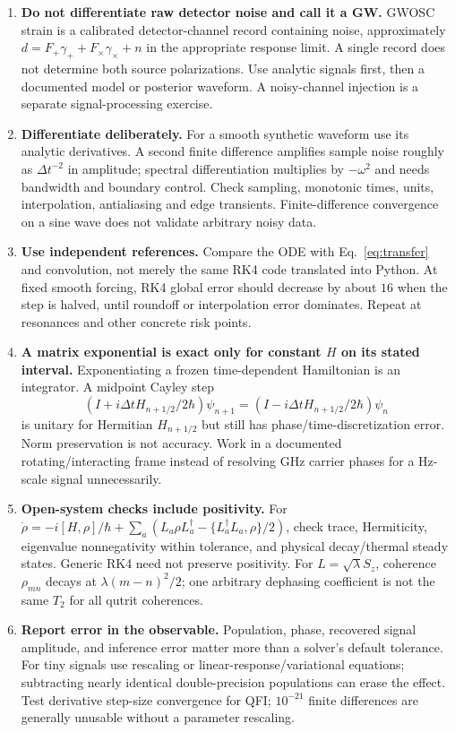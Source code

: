 \documentclass[a4paper,11pt]{article}
\begin{document}
\begin{enumerate}
\item \textbf{Do not differentiate raw detector noise and call it a GW.} GWOSC strain is a calibrated detector-channel record containing noise, approximately $d=F_+\gamma_++F_\times\gamma_\times+n$ in the appropriate response limit. A single record does not determine both source polarizations. Use analytic signals first, then a documented model or posterior waveform. A noisy-channel injection is a separate signal-processing exercise.~\cite{gwosc,ligonoise}
\item \textbf{Differentiate deliberately.} For a smooth synthetic waveform use its analytic derivatives. A second finite difference amplifies sample noise roughly as $\Delta t^{-2}$ in amplitude; spectral differentiation multiplies by $-\omega^2$ and needs bandwidth and boundary control. Check sampling, monotonic times, units, interpolation, antialiasing and edge transients. Finite-difference convergence on a sine wave does not validate arbitrary noisy data.
\item \textbf{Use independent references.} Compare the ODE with Eq.~\eqref{eq:transfer} and convolution, not merely the same RK4 code translated into Python. At fixed smooth forcing, RK4 global error should decrease by about $16$ when the step is halved, until roundoff or interpolation error dominates. Repeat at resonances and other concrete risk points.
\item \textbf{A matrix exponential is exact only for constant $H$ on its stated interval.} Exponentiating a frozen time-dependent Hamiltonian is an integrator. A midpoint Cayley step
\[
 (I+i\Delta tH_{n+1/2}/2\hbar)\psi_{n+1}
 =(I-i\Delta tH_{n+1/2}/2\hbar)\psi_n
\]
is unitary for Hermitian $H_{n+1/2}$ but still has phase/time-discretization error. Norm preservation is not accuracy. Work in a documented rotating/interacting frame instead of resolving GHz carrier phases for a Hz-scale signal unnecessarily.
\item \textbf{Open-system checks include positivity.} For
$\dot\rho=-i[H,\rho]/\hbar+\sum_a(L_a\rho L_a^\dagger-\{L_a^\dagger L_a,\rho\}/2)$,
check trace, Hermiticity, eigenvalue nonnegativity within tolerance, and physical decay/thermal steady states. Generic RK4 need not preserve positivity. For $L=\sqrt\lambda S_z$, coherence $\rho_{mn}$ decays at $\lambda(m-n)^2/2$; one arbitrary dephasing coefficient is not the same $T_2$ for all qutrit coherences.
\item \textbf{Report error in the observable.} Population, phase, recovered signal amplitude, and inference error matter more than a solver's default tolerance. For tiny signals use rescaling or linear-response/variational equations; subtracting nearly identical double-precision populations can erase the effect. Test derivative step-size convergence for QFI; $10^{-21}$ finite differences are generally unusable without a parameter rescaling.

\end{enumerate}
\end{document}
